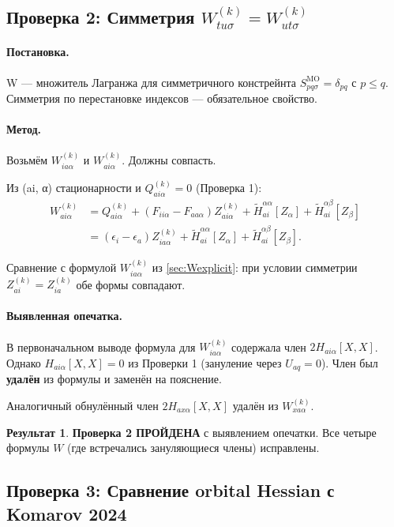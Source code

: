 \documentclass[11pt, a4paper]{article}
\theoremstyle{definition}
\newtheorem*{result}{Результат}
\newcommand{\MO}{\text{MO}}
\begin{document}
\subsection{Проверка 2: Симметрия $W^{(k)}_{tu\sigma} = W^{(k)}_{ut\sigma}$}

\paragraph{Постановка.} W --- множитель Лагранжа для симметричного констрейнта $S^{\MO}_{pq\sigma} = \delta_{pq}$ с $p \le q$. Симметрия по перестановке индексов --- обязательное свойство.

\paragraph{Метод.} Возьмём $W^{(k)}_{ia\alpha}$ и $W^{(k)}_{ai\alpha}$. Должны совпасть.

Из (ai, α) стационарности и $Q^{(k)}_{ai\alpha} = 0$ (Проверка 1):
\begin{align}
    W^{(k)}_{ai\alpha} &= Q^{(k)}_{ai\alpha} + (F_{ii\alpha} - F_{aa\alpha}) Z^{(k)}_{ai\alpha} + \tilde H^{\alpha\alpha}_{ai}[Z_\alpha] + \tilde H^{\alpha\beta}_{ai}[Z_\beta] \\
    &= (\epsilon_i - \epsilon_a) Z^{(k)}_{ia\alpha} + \tilde H^{\alpha\alpha}_{ai}[Z_\alpha] + \tilde H^{\alpha\beta}_{ai}[Z_\beta].
\end{align}

Сравнение с формулой $W^{(k)}_{ia\alpha}$ из \cref{sec:Wexplicit}: при условии симметрии $Z^{(k)}_{ai} = Z^{(k)}_{ia}$ обе формы совпадают.

\paragraph{Выявленная опечатка.} В первоначальном выводе формула для $W^{(k)}_{ia\alpha}$ содержала член $2 H_{ai\alpha}[X, X]$. Однако $H_{ai\alpha}[X, X] = 0$ из Проверки 1 (зануление через $U_{aq} = 0$). Член был \textbf{удалён} из формулы и заменён на пояснение.

Аналогичный обнулённый член $2 H_{ax\alpha}[X, X]$ удалён из $W^{(k)}_{xa\alpha}$.

\begin{result}
\textbf{Проверка 2 ПРОЙДЕНА} с выявлением опечатки. Все четыре формулы $W$ (где встречались зануляющиеся члены) исправлены.
\end{result}

\subsection{Проверка 3: Сравнение orbital Hessian с Komarov 2024}
\end{document}
